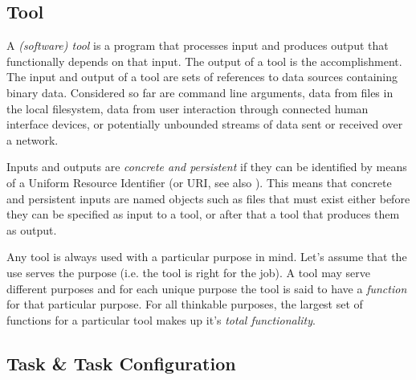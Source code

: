 \documentclass{article}
\begin{document}
  \subsection{Tool}

   A \textit{(software) tool} is a program that processes input and produces
   output that functionally depends on that input. The output of a tool is the
   accomplishment. The input and output of a tool are sets of references to
   data sources containing binary data. Considered so far are command line
   arguments, data from files in the local filesystem, data from user
   interaction through connected human interface devices, or potentially
   unbounded streams of data sent or received over a network.
   
   Inputs and outputs are \textit{concrete and persistent} if they can be
   identified by means of a Uniform Resource Identifier (or URI, see also
   \cite{rfc3305}). This means that concrete and persistent inputs are named
   objects such as files that must exist either before they can be specified as
   input to a tool, or after that a tool that produces them as output.
   
   Any tool is always used with a particular purpose in mind. Let's assume that
   the use serves the purpose (i.e. the tool is right for the job). A tool may
   serve different purposes and for each unique purpose the tool is said to
   have a \emph{function} for that particular purpose. For all thinkable
   purposes, the largest set of functions for a particular tool makes up it's
   \textit{total functionality}.


  \subsection{Task \& Task Configuration} \label{concepts::task_configuration}

   
\end{document}
